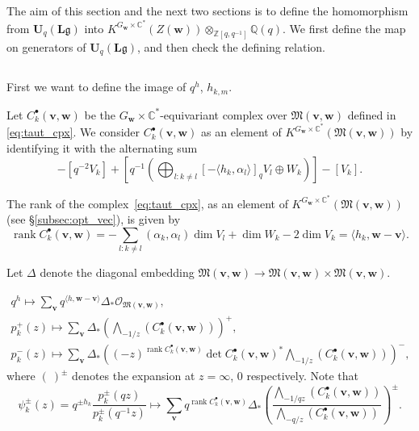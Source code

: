 \documentclass[12pt]{amsart}
\def\Bbb{\mathbb}
\def\frak{\mathfrak}
\theoremstyle{definition}
\theoremstyle{remark}
\numberwithin{equation}{subsection}
\newcommand{\subsecref}[1]{\S\ref{#1}}
\newcommand{\C}{{\Bbb C}}
\newcommand{\Z}{{\Bbb Z}}
\newcommand{\Q}{{\Bbb Q}}
\newcommand{\rank}{\operatorname{rank}}
\newcommand{\M}{{\frak M}} %
\newcommand{\bv}{{\mathbf v}} %
\newcommand{\bw}{{\mathbf w}} %
\newcommand{\Ul}{{\mathbf U}_q({\mathbf L}{\mathfrak g})} %
\newcommand{\shfO}{\mathcal O}
\newcommand{\Wedge}{{\textstyle \bigwedge}}
\newcommand{\Zw}{Z(\bw)}
\begin{document}
The aim of this section and the next two sections is to define the
homomorphism from $\Ul$ into
$K^{G_\bw\times\C^*}(\Zw)\otimes_{\Z[q,q^{-1}]}\Q(q)$.
We first define the map on generators of $\Ul$, and then check the
defining relation.

\subsection{}
First we want to define the image of $q^h$, $h_{k,m}$.

Let $C_k^\bullet(\bv,\bw)$ be the $G_\bw\times\C^*$-equivariant complex 
over $\M(\bv,\bw)$ defined in \eqref{eq:taut_cpx}.
%
We consider $C_k^\bullet(\bv,\bw)$ as an element of
$K^{G_\bw\times\C^*}(\M(\bv,\bw))$ by identifying it with
the alternating sum
\begin{equation*}
  - [q^{-2} V_k]
  + \left[q^{-1} \left( \displaystyle{\bigoplus_{l:k\neq l}}
     [-\langle h_k,\alpha_l\rangle]_q V_l
    \oplus W_k\right) \right]
  - [V_k].
\end{equation*}

The rank of the complex~\eqref{eq:taut_cpx},
as an element of $K^{G_\bw\times\C^*}(\M(\bv,\bw))$ (see
\subsecref{subsec:opt_vec}),
is given by
\begin{equation*}
   \rank C^\bullet_k(\bv,\bw) = 
   - \sum_{l:k\neq l} (\alpha_k,\alpha_l) \dim V_l + \dim W_k - 2\dim V_k
   = \langle h_k, \bw - \bv\rangle.
\end{equation*}

Let $\Delta$ denote the diagonal embedding $\M(\bv,\bw)\to
\M(\bv,\bw)\times\M(\bv,\bw)$.

\begin{equation}\label{eq:defH}
\begin{gathered}
   q^{h} \longmapsto \sum_\bv q^{\langle h, \bw-\bv\rangle}
     \Delta_* \shfO_{\M(\bv,\bw)}, \\
   p_k^+(z)
     \longmapsto
     \sum_{\bv} \Delta_*
      \left(\Wedge_{-1/z} (C_k^\bullet(\bv,\bw))\right)^+, \\
   p_k^-(z)
     \longmapsto
     \sum_{\bv} \Delta_* 
    \left((-z)^{\rank C_k^\bullet(\bv,\bw)}\det C_k^\bullet(\bv,\bw)^*
       \Wedge_{-1/z} (C_k^\bullet(\bv,\bw))\right)^-,
\end{gathered}
\end{equation}
where $(\ )^\pm$ denotes the expansion at $z = \infty$, $0$ respectively.
Note that
\begin{equation*}
  \psi_k^\pm(z) = q^{\pm h_k} \frac{p_k^\pm(q z)}{p_k^\pm(q^{-1}z)}
  \longmapsto
  \sum_{\bv} q^{\rank C_k^\bullet(\bv,\bw)}\Delta_*
      \left(\frac{\Wedge_{-1/qz} (C_k^\bullet(\bv,\bw))}
                 {\Wedge_{-q/z} (C_k^\bullet(\bv,\bw))}\right)^\pm.
\end{equation*}
\end{document}
